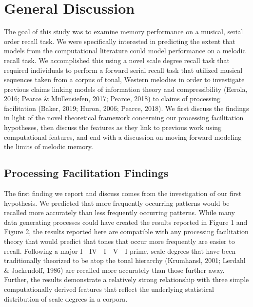 \documentclass[english,man,floatsintext]{apa6}
\begin{document}
\newpage

\hypertarget{general-discussion}{%
\section{General Discussion}\label{general-discussion}}

The goal of this study was to examine memory performance on a musical, serial order recall task.
We were specifically interested in predicting the extent that models from the computational literature could model performance on a melodic recall task.
We accomplished this using a novel scale degree recall task that required individuals to perform a forward serial recall task that utilized musical sequences taken from a corpus of tonal, Western melodies in order to investigate previous claims linking models of information theory and compressibility (Eerola, 2016; Pearce \& Müllensiefen, 2017; Pearce, 2018) to claims of processing facilitation (Baker, 2019; Huron, 2006; Pearce, 2018).
We first discuss the findings in light of the novel theoretical framework concerning our processing facilitation hypotheses, then discuss the features as they link to previous work using computational features, and end with a discussion on moving forward modeling the limits of melodic memory.

\hypertarget{processing-facilitation-findings}{%
\subsection{Processing Facilitation Findings}\label{processing-facilitation-findings}}

The first finding we report and discuss comes from the investigation of our first hypothesis.
We predicted that more frequently occurring patterns would be recalled more accurately than less frequently occurring patterns.
While many data generating processes could have created the results reported in Figure 1 and Figure 2, the results reported here are compatible with any processing facilitation theory that would predict that tones that occur more frequently are easier to recall.
Following a major I - IV - I - V - I prime, scale degrees that have been traditionally theorized to be atop the tonal hierarchy (Krumhansl, 2001; Lerdahl \& Jackendoff, 1986) are recalled more accurately than those further away.
Further, the results demonstrate a relatively strong relationship with three simple computationally derived features that reflect the underlying statistical distribution of scale degrees in a corpora.
\end{document}
